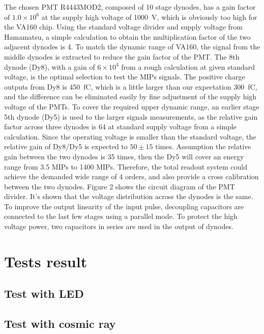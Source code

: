 \documentclass[5p, times]{elsarticle}
\begin{document}
The chosen PMT R4443MOD2, composed of 10 stage dynodes, has a gain factor of $1.0\times 10^6$ at the supply high voltage of \SI{1000}{\volt}, which is obviously too high for the VA160 chip. 
Using the standard voltage divider and supply voltage from Hamamatsu, a simple calculation to obtain the multiplication factor of the two adjacent dynodes is 4. 
To match the dynamic range of VA160, the signal from the middle dynodes is extracted to reduce the gain factor of the PMT. 
The 8th dynode (Dy8), with a gain of $6\times 10^4$ from a rough calculation at given standard voltage, is the optimal selection to test the MIPs signals. 
The positive charge outputs from Dy8 is \SI{450}{\femto\coulomb}, which is a little larger than our expectation \SI{300}{\femto\coulomb}, and the difference can be eliminated easily by fine adjustment of the supply high voltage of the PMTs. 
To cover the required upper dynamic range, an earlier stage 5th dynode (Dy5) is used to the larger signals measurements, as the relative gain factor across three dynodes is 64 at standard supply voltage from a simple calculation. 
Since the operating voltage is smaller than the standard voltage, the relative gain of Dy8/Dy5 is expected to $50\pm15$ times. 
Assumption the relative gain between the two dynodes is 35 times, then the Dy5 will cover an energy range from 3.5 MIPs to 1400 MIPs. 
Therefore, the total readout system could achieve the demanded wide range of 4 orders, and also provide a cross calibration between the two dynodes. 
Figure 2 shows the circuit diagram of the PMT divider. 
It’s shown that the voltage distribution across the dynodes is the same. 
To improve the output linearity of the input pulse, decoupling capacitors are connected to the last few stages using a parallel mode. 
To protect the high voltage power, two capacitors in series are used in the output of dynodes.

\section{Tests result}
\label{sec:result}

\subsection{Test with LED}

\subsection{Test with cosmic ray}
\label{sec:cosmicray}
\end{document}
